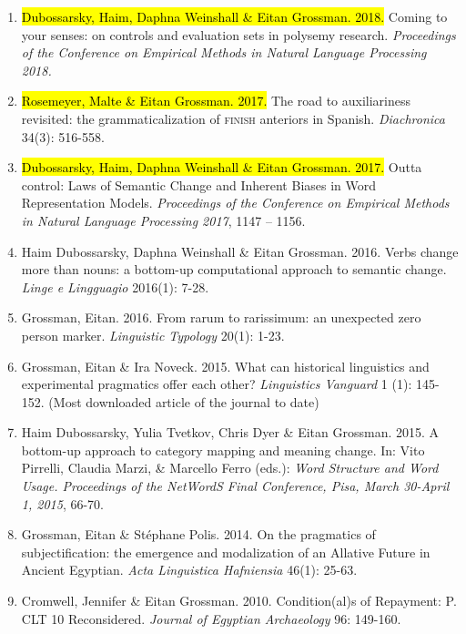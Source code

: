 \documentclass[letterpaper,11pt]{article}
\begin{document}
\begin{enumerate}[resume]
\item {\hl{Dubossarsky, Haim, Daphna Weinshall \& Eitan Grossman. 2018.}} Coming to your senses: on controls and evaluation sets in polysemy research. \textit{Proceedings of the Conference on Empirical Methods in Natural Language Processing 2018.}

\item	{\hl{Rosemeyer, Malte \& Eitan Grossman. 2017.}} The road to auxiliariness revisited: the grammaticalization of \textsc{finish} anteriors in Spanish. \textit{Diachronica} 34(3): 516-558.

\item {\hl{Dubossarsky, Haim, Daphna Weinshall \& Eitan Grossman. 2017.}} Outta control: Laws of Semantic Change and Inherent Biases in Word Representation Models. \textit{Proceedings of the Conference on Empirical Methods in Natural Language Processing 2017}, 1147 -- 1156.

\item {Haim Dubossarsky, Daphna Weinshall  \& Eitan Grossman.} {2016.} Verbs change more than nouns: a bottom-up computational approach to semantic change. \textit{Linge e Lingguagio} 2016(1): 7-28.

\item {Grossman, Eitan.} {2016.} From rarum to rarissimum: an unexpected zero person marker. \textit{Linguistic Typology} 20(1): 1-23.

\item {Grossman, Eitan \& Ira Noveck.} {2015.} What can historical linguistics and experimental pragmatics offer each other? \textit{Linguistics Vanguard} 1 (1): 145-152. (Most downloaded article of the journal to date)

\item {Haim Dubossarsky, Yulia Tvetkov, Chris Dyer \& Eitan Grossman.} {2015.} A bottom-up approach to category mapping and meaning change. In: Vito Pirrelli, Claudia Marzi, \& Marcello Ferro (eds.): \textit{Word Structure and Word Usage. Proceedings of the NetWordS Final Conference, Pisa, March 30-April 1, 2015}, 66-70.

\item {Grossman, Eitan \& St\'ephane Polis.} {2014.} On the pragmatics of subjectification: the emergence and modalization of an Allative Future in Ancient Egyptian. \textit{Acta Linguistica Hafniensia} 46(1): 25-63. 

\item {Cromwell, Jennifer  \& Eitan Grossman.} {2010.} Condition(al)s of Repayment: P. CLT 10 Reconsidered. \textit{Journal of Egyptian Archaeology} 96: 149-160.


\end{enumerate}
\end{document}

